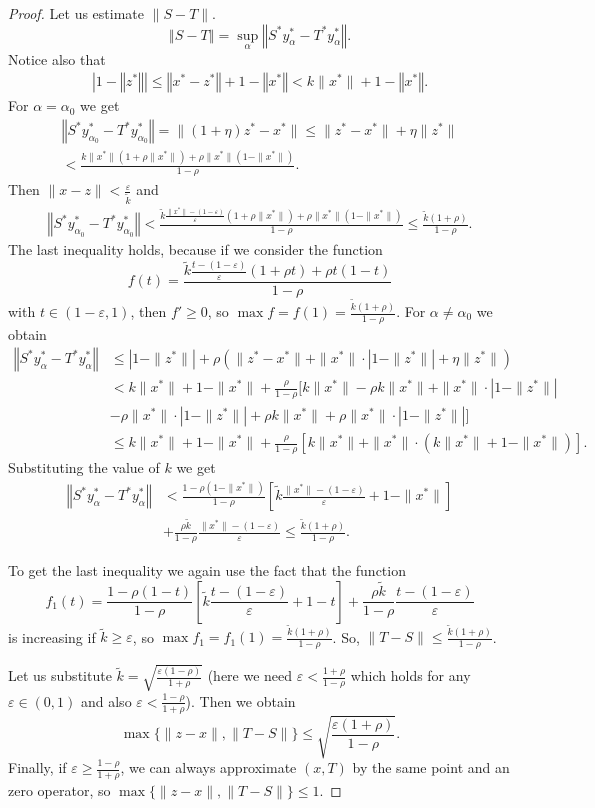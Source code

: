 \documentclass[11pt,a4paper]{amsart}
\newcommand{\eps}{\varepsilon}
\newcommand{\norm}[1]{\left\Vert#1\right\Vert}
\numberwithin{equation}{section}
\theoremstyle{plain}
\theoremstyle{definition}
\renewcommand{\leq}{\leqslant}
\renewcommand{\geq}{\geqslant}
\begin{document}
\begin{proof}
Let us estimate $\|S-T\|$.
$$\norm{S-T} = \sup_\alpha \norm{S^*y^*_{\alpha}-T^*y^*_{\alpha}}.$$ 
Notice also that
\begin{align*}|1-\norm{z^*}|\leq \norm{x^*-z^*} + 1 - \norm{x^*}< k\|x^*\|+ 1 - \norm{x^*}.
\end{align*}
For $\alpha = \alpha_0$ we get 
\begin{align*}
\norm{S^*y^*_{\alpha_0}-T^*{y^*_{\alpha_0}}}=\|(1+\eta)z^*-x^*\|
\leq\|z^*-x^*\|+\eta\|z^*\|\\
<\frac{k\|x^*\|(1+\rho\|x^*\|)+\rho\|x^*\|(1-\|x^*\|)}{1-\rho}.
\end{align*}
Then $\|x-z\|<\frac{\eps}{\tilde{k}}$ and
\begin{align*}
\norm{S^*y^*_{\alpha_0}-T^*{y^*_{\alpha_0}}}
<\frac{\tilde{k}\frac{\|x^*\|-(1-\eps)}{\eps}(1+\rho\|x^*\|)+\rho\|x^*\|(1-\|x^*\|)}{1-\rho}
\leq\frac{\tilde{k}(1+\rho)}{1-\rho}.
\end{align*}
The last inequality holds, because  if we consider the function $$f(t)=\frac{\tilde{k}\frac{t-(1-\eps)}{\eps}(1+\rho t)+\rho t(1-t)}{1-\rho}$$ with $t\in (1-\eps, 1)$, then ${f'}\geq 0$, so $\max f = f(1)=\frac{\tilde{k}(1+\rho)}{1-\rho}$.  For $\alpha \neq \alpha_0$ we obtain
\begin{align*}
\norm{S^*y^*_{\alpha}-T^*{y^*_{\alpha}}}&\leq |1-\|z^*\||+\rho (\|z^*-x^*\| +\|x^*\|\cdot|1-\|z^*\||+\eta \|z^*\| )\\
&< k\|x^*\| + 1-\|x^*\|+\frac{\rho}{1-\rho}[k\|x^*\|-\rho k \|x^*\|+\|x^*\|\cdot|1-\|z^*\|| \\
&-\rho\|x^*\|\cdot|1-\|z^*\||+\rho k \|x^*\|+ \rho\|x^*\|\cdot|1-\|z^*\||]\\
&\leq k\|x^*\| + 1-\|x^*\|+\frac{\rho}{1-\rho}[k\|x^*\| +\|x^*\|\cdot(k\|x^*\|+1-\|x^*\|)].
\end{align*} 
Substituting the value of ${k}$ we get 
\begin{align*}
\norm{S^*y^*_{\alpha}-T^*{y^*_{\alpha}}}&< \frac{1-\rho(1-\|x^*\|)}{1-\rho}\left[\tilde{k}\frac{\|x^*\|-(1-\eps)}{\eps}+1-\|x^*\|\right]\\
&+\frac{\rho \tilde{k}}{1-\rho}\frac{\|x^*\|-(1-\eps)}{\eps}\leq\frac{\tilde{k}(1+\rho)}{1-\rho}.
\end{align*}

To get the last inequality we again use the fact that the function 
$$f_1(t)=\frac{1-\rho(1-t)}{1-\rho}\left[\tilde{k}\frac{t-(1-\eps)}{\eps}+1-t\right]
+\frac{\rho \tilde{k}}{1-\rho}\frac{t-(1-\eps)}{\eps}$$ 
 is increasing if $\tilde{k} \geq\eps$, so $\max f_1 = f_1(1)=\frac{\tilde{k}(1+\rho)}{1-\rho}$. So, $\|T-S\|\leq\frac{\tilde{k}(1+\rho)}{1-\rho}$.
 
Let us substitute $\tilde{k}=\sqrt{\frac{\eps(1-\rho)}{1+\rho}}$ (here we need $\eps<\frac{1+\rho}{1-\rho}$ which holds for any $\eps\in (0,1)$ and also $\eps<\frac{1-\rho}{1+\rho}$). Then we obtain 
$$\max\{\|z-x\|, \|T-S\|\}\leq\sqrt{\frac{\eps(1+\rho)}{1-\rho}}.$$
Finally, if $\eps\geq\frac{1-\rho}{1+\rho}$, we can always approximate $(x, T)$ by the same point and an zero operator, so $\max\{\|z-x\|, \|T-S\|\}\leq 1.$
\end{proof}
\end{document}
